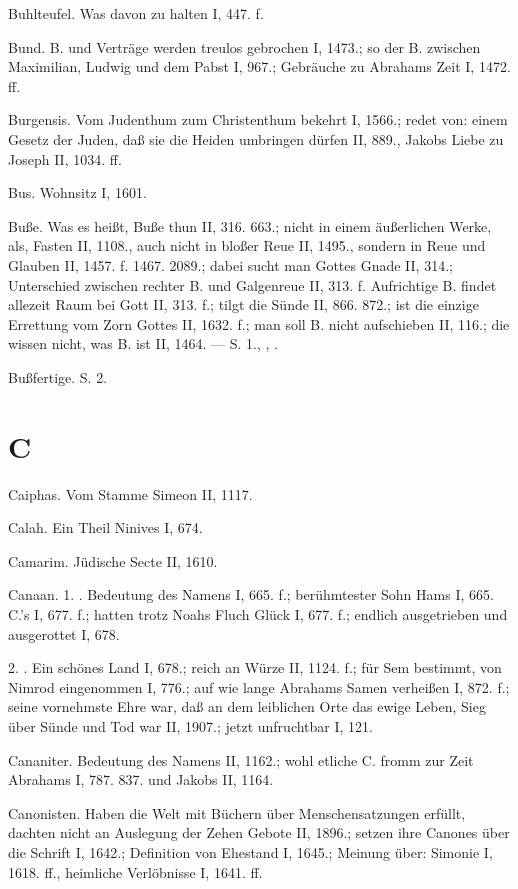 Buhlteufel. Was davon zu halten I, 447. f.

Bund. B. und Verträge werden treulos gebrochen I, 1473.; so der B. zwischen Maximilian, Ludwig und dem Pabst I, 967.; Gebräuche zu Abrahams Zeit I, 1472. ff.

Burgensis. Vom Judenthum zum Christenthum bekehrt I, 1566.; redet von: einem Gesetz der Juden, daß sie die Heiden umbringen dürfen II, 889., Jakobs Liebe zu Joseph II, 1034. ff.

Bus. Wohnsitz I, 1601.

Buße. Was es heißt, Buße thun II, 316. 663.;  nicht in einem äußerlichen Werke, als, Fasten II, 1108., auch nicht in bloßer Reue II, 1495., sondern in Reue und Glauben II, 1457. f. 1467. 2089.; dabei sucht man Gottes Gnade II, 314.; Unterschied zwischen rechter B. und Galgenreue II, 313. f. Aufrichtige B. findet allezeit Raum bei Gott II, 313. f.; tilgt die Sünde II, 866. 872.; ist die einzige Errettung vom Zorn Gottes II, 1632. f.; man soll B. nicht aufschieben II, 116.; die  wissen nicht, was B. ist II, 1464. — S.  1., , .

Bußfertige. S.  2.

\section{C}

Caiphas. Vom Stamme Simeon II, 1117.

Calah. Ein Theil Ninives I, 674.

Camarim. Jüdische Secte II, 1610.

Canaan. 1. . Bedeutung des Namens I, 665. f.; berühmtester Sohn Hams I, 665. C.’s  I, 677. f.; hatten trotz Noahs Fluch Glück I, 677. f.; endlich ausgetrieben und ausgerottet I, 678.

2. . Ein schönes Land I, 678.; reich an Würze II, 1124. f.; für Sem bestimmt, von Nimrod eingenommen I, 776.; auf wie lange Abrahams Samen verheißen I, 872. f.; seine vornehmste Ehre war, daß an dem leiblichen Orte das ewige Leben, Sieg über Sünde und Tod war II, 1907.; jetzt unfruchtbar I, 121.

Cananiter. Bedeutung des Namens II, 1162.; wohl etliche C. fromm zur Zeit Abrahams I, 787. 837. und Jakobs II, 1164.

Canonisten. Haben die Welt mit Büchern über Menschensatzungen erfüllt, dachten nicht an Auslegung der Zehen Gebote II, 1896.; setzen ihre Canones über die Schrift I, 1642.; Definition von Ehestand I, 1645.; Meinung über: Simonie I, 1618. ff., heimliche Verlöbnisse I, 1641. ff.

